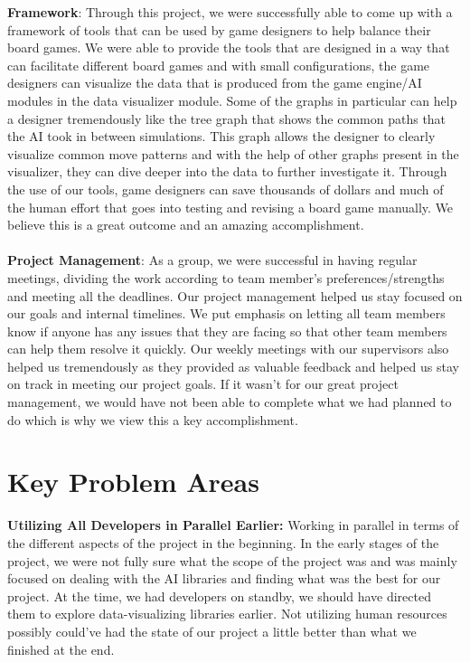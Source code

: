 \documentclass{article}
\begin{document}
\textbf{Framework}: Through this project, we were successfully able to come up with a framework of tools that can be used by game designers to help balance their board games. We were able to provide the tools that are designed in a way that can facilitate different board games and with small configurations, the game designers can visualize the data that is produced from the game engine/AI modules in the data visualizer module. Some of the graphs in particular can help a designer tremendously like the tree graph that shows the common paths that the AI took in between simulations. This graph allows the designer to clearly visualize common move patterns and with the help of other graphs present in the visualizer, they can dive deeper into the data to further investigate it. Through the use of our tools, game designers can save thousands of dollars and much of the human effort that goes into testing and revising a board game manually. We believe this is a great outcome and an amazing accomplishment. 
\\\\
\textbf{Project Management}: As a group, we were successful in having regular meetings, dividing the work according to team member's preferences/strengths and meeting all the deadlines. Our project management helped us stay focused on our goals and internal timelines. We put emphasis on letting all team members know if anyone has any issues that they are facing so that other team members can help them resolve it quickly. Our weekly meetings with our supervisors also helped us tremendously as they provided as valuable feedback and helped us stay on track in meeting our project goals. If it wasn't for our great project management, we would have not been able to complete what we had planned to do which is why we view this a key accomplishment.

\section{Key Problem Areas}

\textbf{Utilizing All Developers in Parallel Earlier:} Working in parallel in terms of the different aspects of the project in the beginning. In the early stages of the project, we were not fully sure what the scope of the project was and was mainly focused on dealing with the AI libraries and finding what was the best for our project. At the time, we had developers on standby, we should have directed them to explore data-visualizing libraries earlier. Not utilizing human resources possibly could've had the state of our project a little better than what we finished at the end. 
\end{document}

